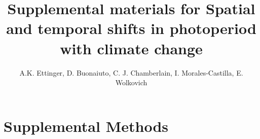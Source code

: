 \documentclass{article}
\begin{document}
 
\title{Supplemental materials for Spatial and temporal shifts in photoperiod with climate change} %

\author{A.K. Ettinger, D. Buonaiuto, C. J. Chamberlain, I. Morales-Castilla, E. Wolkovich}
\maketitle  %


\renewcommand{\thetable}{S\arabic{table}}
\renewcommand{\thefigure}{S\arabic{figure}}

\section*{Supplemental Methods}
\end{document}
